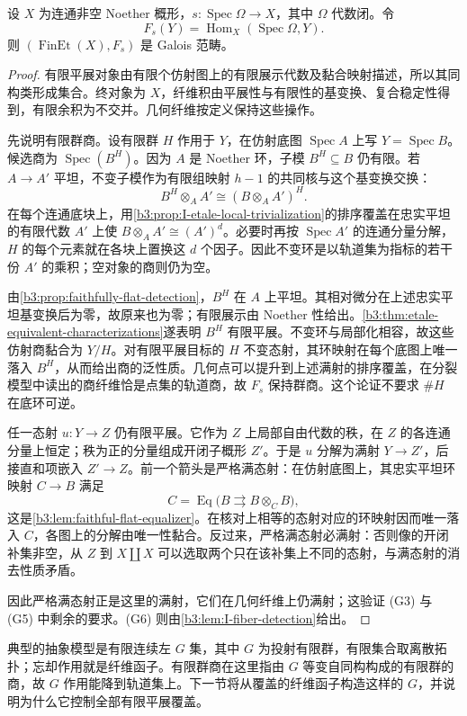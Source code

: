 \begin{proposition}\label{b3:prop:I-finite-etale-galois-category}
	设 \(X\) 为连通非空 Noether 概形，\(s:\operatorname{Spec}\Omega\rightarrow X\)，其中 \(\Omega\) 代数闭。令
	\[
		F_s(Y)=\operatorname{Hom}_X(\operatorname{Spec}\Omega,Y).
	\]
	则 \((\operatorname{FinEt}(X),F_s)\) 是 Galois 范畴。
\end{proposition}
\begin{proof}
	有限平展对象由有限个仿射图上的有限展示代数及黏合映射描述，所以其同构类形成集合。终对象为 \(X\)，纤维积由平展性与有限性的基变换、复合稳定性得到，有限余积为不交并。几何纤维按定义保持这些操作。

	先说明有限群商。设有限群 \(H\) 作用于 \(Y\)，在仿射底图 \(\operatorname{Spec}A\) 上写 \(Y=\operatorname{Spec}B\)。候选商为 \(\operatorname{Spec}(B^H)\)。因为 \(A\) 是 Noether 环，子模 \(B^H\subseteq B\) 仍有限。若 \(A\rightarrow A'\) 平坦，不变子模作为有限组映射 \(h-1\) 的共同核与这个基变换交换：
	\[
		B^H\otimes_A A'\cong(B\otimes_A A')^H.
	\]
	在每个连通底块上，用\cref{b3:prop:I-etale-local-trivialization}的排序覆盖在忠实平坦的有限代数 \(A'\) 上使 \(B\otimes_A A'\cong(A')^d\)。必要时再按 \(\operatorname{Spec}A'\) 的连通分量分解，\(H\) 的每个元素就在各块上置换这 \(d\) 个因子。因此不变环是以轨道集为指标的若干份 \(A'\) 的乘积；空对象的商则仍为空。

	由\cref{b3:prop:faithfully-flat-detection}，\(B^H\) 在 \(A\) 上平坦。其相对微分在上述忠实平坦基变换后为零，故原来也为零；有限展示由 Noether 性给出。\cref{b3:thm:etale-equivalent-characterizations}遂表明 \(B^H\) 有限平展。不变环与局部化相容，故这些仿射商黏合为 \(Y/H\)。对有限平展目标的 \(H\) 不变态射，其环映射在每个底图上唯一落入 \(B^H\)，从而给出商的泛性质。几何点可以提升到上述满射的排序覆盖，在分裂模型中读出的商纤维恰是点集的轨道商，故 \(F_s\) 保持群商。这个论证不要求 \(\#H\) 在底环可逆。

	任一态射 \(u:Y\rightarrow Z\) 仍有限平展。它作为 \(Z\) 上局部自由代数的秩，在 \(Z\) 的各连通分量上恒定；秩为正的分量组成开闭子概形 \(Z'\)。于是 \(u\) 分解为满射 \(Y\rightarrow Z'\)，后接直和项嵌入 \(Z'\rightarrow Z\)。前一个箭头是严格满态射：在仿射底图上，其忠实平坦环映射 \(C\rightarrow B\) 满足
	\[
		C=\operatorname{Eq}\bigl(B\rightrightarrows B\otimes_C B\bigr),
	\]
	这是\cref{b3:lem:faithful-flat-equalizer}。在核对上相等的态射对应的环映射因而唯一落入 \(C\)，各图上的分解由唯一性黏合。反过来，严格满态射必满射：否则像的开闭补集非空，从 \(Z\) 到 \(X\amalg X\) 可以选取两个只在该补集上不同的态射，与满态射的消去性质矛盾。

	因此严格满态射正是这里的满射，它们在几何纤维上仍满射；这验证 (G3) 与 (G5) 中剩余的要求。(G6) 则由\cref{b3:lem:I-fiber-detection}给出。
\end{proof}

典型的抽象模型是有限连续左 \(G\) 集，其中 \(G\) 为投射有限群，有限集合取离散拓扑；忘却作用就是纤维函子。有限群商在这里指由 \(G\) 等变自同构构成的有限群的商，故 \(G\) 作用能降到轨道集上。下一节将从覆盖的纤维函子构造这样的 \(G\)，并说明为什么它控制全部有限平展覆盖。

